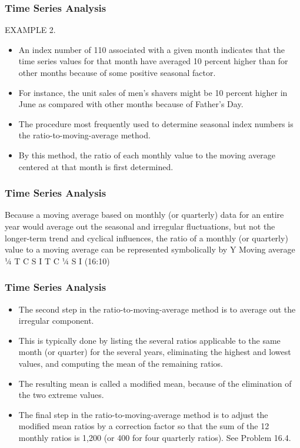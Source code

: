 \documentclass{beamer}
\begin{document}
\begin{frame}
\frametitle{Time Series Analysis}
EXAMPLE 2. 
\begin{itemize}
\item An index number of 110 associated with a given month indicates that the time series values for that month
have averaged 10 percent higher than for other months because of some positive seasonal factor. 
\item For instance, the unit sales
of men’s shavers might be 10 percent higher in June as compared with other months because of Father’s Day.
\item The procedure most frequently used to determine seasonal index numbers is the ratio-to-moving-average
method.
\item By this method, the ratio of each monthly value to the moving average centered at that month is first
determined. 
\end{itemize}
\end{frame}
\begin{frame}
\frametitle{Time Series Analysis}
Because a moving average based on monthly (or quarterly) data for an entire year would average
out the seasonal and irregular fluctuations, but not the longer-term trend and cyclical influences, the ratio of a
monthly (or quarterly) value to a moving average can be represented symbolically by
Y
Moving average
¼
T   C   S   I
T   C
¼ S   I (16:10)

\end{frame}
\begin{frame}
\frametitle{Time Series Analysis}
\begin{itemize}
\item The second step in the ratio-to-moving-average method is to average out the irregular component.
\item  This is
typically done by listing the several ratios applicable to the same month (or quarter) for the several years,
eliminating the highest and lowest values, and computing the mean of the remaining ratios.
\item  The resulting mean
is called a modified mean, because of the elimination of the two extreme values.
\item The final step in the ratio-to-moving-average method is to adjust the modified mean ratios by a
correction factor so that the sum of the 12 monthly ratios is 1,200 (or 400 for four quarterly ratios). See
Problem 16.4.
\end{itemize}
\end{frame}
\end{document}
